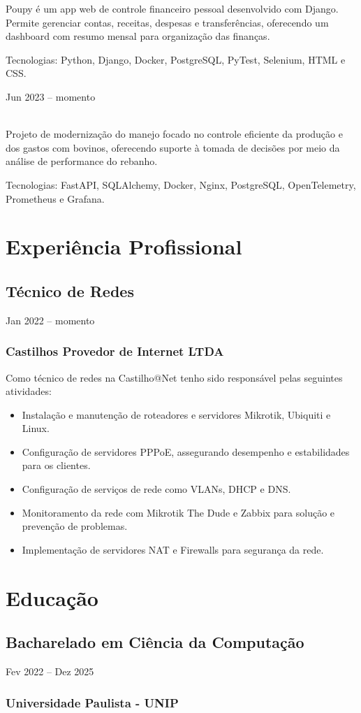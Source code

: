 \documentclass{cv}
\begin{document}
Poupy é um app web de controle financeiro pessoal desenvolvido com Django.
Permite gerenciar contas, receitas, despesas e transferências, oferecendo
um dashboard com resumo mensal para organização das finanças.

\vspace{0.08cm}

Tecnologias: Python, Django, Docker, PostgreSQL, PyTest, Selenium, HTML e CSS.

\hfill{Jun 2023 -- momento}\\
\\
\vspace{0.15cm}

Projeto de modernização do manejo focado no controle eficiente da produção e dos
gastos com bovinos, oferecendo suporte à tomada de decisões por meio da análise de performance do rebanho.

\vspace{0.08cm}

Tecnologias: FastAPI, SQLAlchemy, Docker, Nginx, PostgreSQL, OpenTelemetry, Prometheus e Grafana.

\section{Experiência Profissional}

\subsection{Técnico de Redes}
{Jan 2022 -- momento}
\subsubsection{Castilhos Provedor de Internet LTDA}

Como técnico de redes na Castilho@Net tenho sido responsável pelas
seguintes atividades:

\begin{itemize}
  \item Instalação e manutenção de roteadores e servidores Mikrotik,
    Ubiquiti e Linux.
  \item Configuração de servidores PPPoE, assegurando desempenho e
    estabilidades para os clientes.
  \item Configuração de serviços de rede como VLANs, DHCP e DNS.
  \item Monitoramento da rede com Mikrotik The Dude e Zabbix para
    solução e prevenção de problemas.
  \item Implementação de servidores NAT e Firewalls para segurança da rede.
\end{itemize}

\section{Educação}

\subsection{Bacharelado em Ciência da Computação}
{Fev 2022 -- Dez 2025}
\subsubsection{Universidade Paulista - UNIP}
\end{document}
